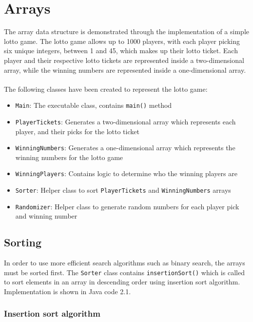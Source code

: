 \newpage
\section{Arrays}

The array data structure is demonstrated through the implementation of a simple lotto game. The lotto game allows up to 1000 players, with each player picking six unique integers, between 1 and 45, which makes up their lotto ticket. Each player and their respective lotto tickets are represented inside a two-dimensional array, while the winning numbers are represented inside a one-dimensional array.
\\
\\
The following classes have been created to represent the lotto game:

\begin{itemize}
\item \texttt{Main}: The executable class, contains \texttt{main()} method
\item \texttt{PlayerTickets}: Generates a two-dimensional array which represents each player, and their picks for the lotto ticket
\item \texttt{WinningNumbers}: Generates a one-dimensional array which represents the winning numbers for the lotto game
\item \texttt{WinningPlayers}: Contains logic to determine who the winning players are
\item \texttt{Sorter}: Helper class to sort \texttt{PlayerTickets} and \texttt{WinningNumbers} arrays
\item \texttt{Randomizer}: Helper class to generate random numbers for each player pick and winning number
\end{itemize}

\subsection{Sorting}

In order to use more efficient search algorithms such as binary search, the arrays must be sorted first. The \texttt{Sorter} class contains \texttt{insertionSort()} which is called to sort elements in an array in descending order using insertion sort algorithm. Implementation is shown in Java code 2.1.

\subsubsection{Insertion sort algorithm}

